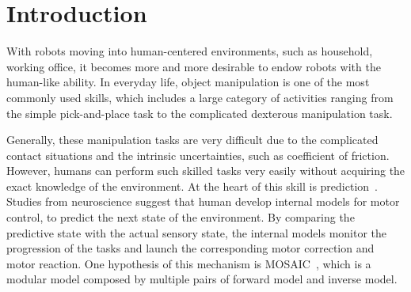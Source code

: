 \section{Introduction}
\label{intro}
With robots moving into human-centered environments, such as household, working office, it becomes more and more desirable to endow robots with the human-like ability. In everyday life, object manipulation is one of the most commonly used skills, which includes a large category of activities ranging from the simple pick-and-place task to the complicated dexterous manipulation task.


Generally, these manipulation tasks are very difficult due to the complicated contact situations and the intrinsic uncertainties, such as coefficient of friction. However, humans can perform such skilled tasks very easily without acquiring the exact knowledge of the environment. At the heart of this skill is prediction~\cite{flanagan2006control}. Studies from neuroscience suggest that human develop internal models for motor control, to predict the next state of the environment. By comparing the predictive state with the actual sensory state, the internal models monitor the progression of the tasks and launch the corresponding motor correction and motor reaction. One hypothesis of this mechanism is MOSAIC~\cite{haruno2001mosaic}, which is a modular model composed by multiple pairs of forward model and inverse model. %


